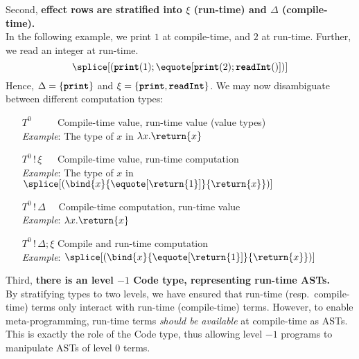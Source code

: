   Second, \textbf{effect rows are stratified into $\xi$ (run-time) and $\Delta$ (compile-time).}\\
  In the following example, we print $1$ at compile-time, and $2$ at run-time. Further, we read an integer at run-time.
\[\splice[(\textbf{\texttt{print}}(1); \equote[\textbf{\texttt{print}}(2); \textbf{\texttt{readInt}}()])]\]
Hence, $\Delta = \{ \textbf{\texttt{print}} \}$ and $\xi = \{ \textbf{\texttt{print}}, \textbf{\texttt{readInt}} \}$. We may now disambiguate between different computation types:
\begin{enumerate}[leftmargin=5.8\parindent]
  \item[$T^0 \quad\quad\,\,$] Compile-time value, run-time value (value types) \\
  \textit{Example}: The type of $x$ in $\lambda x. \return{x}$
  \item[$T^0 \, ! \, \xi \quad\;$] Compile-time value, run-time computation  \\
  \textit{Example}: The type of $x$ in $\splice[(\bind{x}{\equote[\return{1}]}{\return{x}})]$
  \item[$T^0 \, ! \, \Delta \quad$] Compile-time computation, run-time value \\
  \textit{Example}: $\lambda x. \return{x}$ 
  \item[$T^0 \, ! \, \Delta; \xi$] Compile and run-time computation \\
  \textit{Example}: $\splice[(\bind{x}{\equote[\return{1}]}{\return{x}})]$
\end{enumerate}

Third, \textbf{there is an level $-1$ \textsf{Code} type, representing run-time ASTs.}\\ 
  By stratifying types to two levels, we have ensured that run-time (resp.\ compile-time) terms only interact with run-time (compile-time) terms. However, to enable meta-programming, run-time terms \textit{should be available} at compile-time as ASTs. This is exactly the role of the \textsf{Code} type, thus allowing level $-1$ programs to manipulate ASTs of level $0$ terms.

